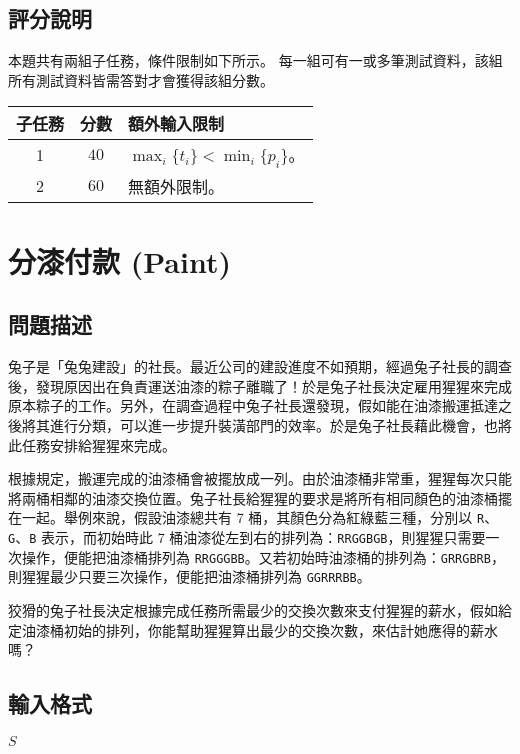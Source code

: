 \subsection{評分說明}

本題共有兩組子任務，條件限制如下所示。
每一組可有一或多筆測試資料，該組所有測試資料皆需答對才會獲得該組分數。

\begin{longtable}[]{@{}ccl@{}}
\toprule
子任務 & 分數 & 額外輸入限制 \\
\midrule
\endhead
1 & \(40\) & \(\max_i\{t_i\} < \min_i\{p_i\}\)。 \\
2 & \(60\) & 無額外限制。 \\
\bottomrule
\end{longtable}

\section{分漆付款 (Paint)}

\subsection{問題描述}

兔子是「兔兔建設」的社長。最近公司的建設進度不如預期，經過兔子社長的調查後，發現原因出在負責運送油漆的粽子離職了！於是兔子社長決定雇用猩猩來完成原本粽子的工作。另外，在調查過程中兔子社長還發現，假如能在油漆搬運抵達之後將其進行分類，可以進一步提升裝潢部門的效率。於是兔子社長藉此機會，也將此任務安排給猩猩來完成。

根據規定，搬運完成的油漆桶會被擺放成一列。由於油漆桶非常重，猩猩每次只能將兩桶相鄰的油漆交換位置。兔子社長給猩猩的要求是將所有相同顏色的油漆桶擺在一起。舉例來說，假設油漆總共有
7 桶，其顏色分為紅綠藍三種，分別以 \texttt{R}、\texttt{G}、\texttt{B}
表示，而初始時此 7
桶油漆從左到右的排列為：\texttt{RRGGBGB}，則猩猩只需要一次操作，便能把油漆桶排列為
\texttt{RRGGGBB}。又若初始時油漆桶的排列為：\texttt{GRRGBRB}，則猩猩最少只要三次操作，便能把油漆桶排列為
\texttt{GGRRRBB}。

狡猾的兔子社長決定根據完成任務所需最少的交換次數來支付猩猩的薪水，假如給定油漆桶初始的排列，你能幫助猩猩算出最少的交換次數，來估計她應得的薪水嗎？

\subsection{輸入格式}

\begin{format}
\f{
$S$
}
\end{format}

